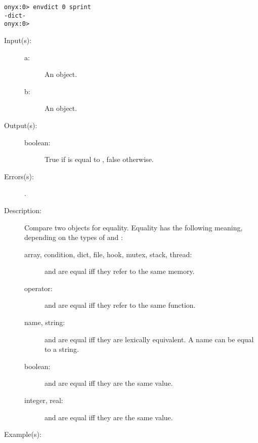 \begin{description}
\begin{description}
\begin{verbatim}
onyx:0> envdict 0 sprint
-dict-
onyx:0>
		\end{verbatim}
	\end{description}
\label{systemdict:eq}
\item[{\onyxop{a b}{eq}{boolean}}: ]
	\begin{description}\item[]
	\item[Input(s): ]
		\begin{description}\item[]
		\item[a: ]
			An object.
		\item[b: ]
			An object.
		\end{description}
	\item[Output(s): ]
		\begin{description}\item[]
		\item[boolean: ]
			True if  is equal to , false
			otherwise.
		\end{description}
	\item[Errors(s): ]
		\begin{description}\item[]
		\item[.]
		\end{description}
	\item[Description: ]
		Compare two objects for equality.  Equality has the following
		meaning, depending on the types of  and :
		\begin{description}
		\item[array, condition, dict, file, hook, mutex, stack,
		thread: ]  and  are equal iff they refer to
		the same memory.
		\item[operator: ]  and  are equal iff they
		refer to the same function.
		\item[name, string: ]  and  are equal iff they
		are lexically equivalent.  A name can be equal to a string.
		\item[boolean: ]  and  are equal iff they
		are the same value.
		\item[integer, real: ]  and  are equal iff
		they are the same value.
		\end{description}
	\item[Example(s): ]\begin{verbatim}


\end{verbatim}
\end{description}
\end{description}
